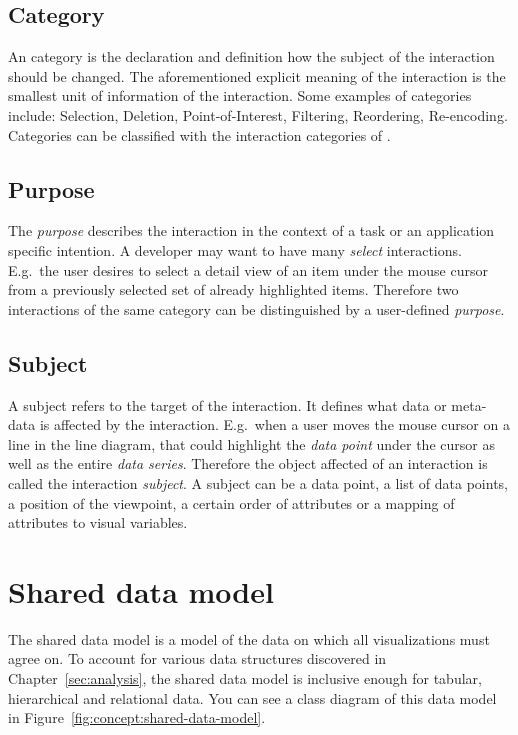 \subsection{Category}
An category is the declaration and definition how the subject of the interaction should be changed.
The aforementioned explicit meaning of the interaction is the smallest unit of information of the interaction.
Some examples of categories include: Selection, Deletion, Point-of-Interest, Filtering, Reordering, Re-encoding.
Categories can be classified with the interaction categories of \textcite{Yi2007}.

\subsection{Purpose}
The \emph{purpose} describes the interaction in the context of a task or an application specific intention.
A developer may want to have many \emph{select} interactions.
E.g.\ the user desires to select a detail view of an item under the mouse cursor from a previously selected set of already highlighted items.
Therefore two interactions of the same category can be distinguished by a user-defined \emph{purpose}.

\subsection{Subject}
A subject refers to the target of the interaction.
It defines what data or meta-data is affected by the interaction.
E.g.\ when a user moves the mouse cursor on a line in the line diagram, that could highlight the \emph{data point} under the cursor as well as the entire \emph{data series}.
Therefore the object affected of an interaction is called the interaction \emph{subject}.
A subject can be a data point, a list of data points, a position of the viewpoint, a certain order of attributes or a mapping of attributes to visual variables.



\section{Shared data model}\label{sec:concept:data-model}
The shared data model is a model of the data on which all visualizations must agree on.
To account for various data structures discovered in Chapter~\ref{sec:analysis}, the shared data model is inclusive enough for tabular, hierarchical and relational data.
You can see a class diagram of this data model in Figure~\ref{fig:concept:shared-data-model}.

